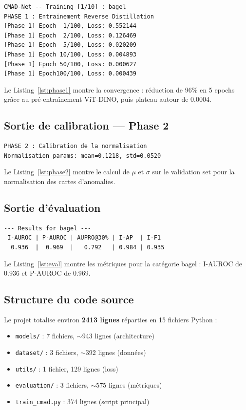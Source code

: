 \documentclass[12pt,a4paper,oneside]{report}
\begin{document}
\begin{lstlisting}[language={}, caption={Sortie d'entraînement Phase 1 (bagel)}, label={lst:phase1}]
CMAD-Net -- Training [1/10] : bagel
PHASE 1 : Entrainement Reverse Distillation
[Phase 1] Epoch  1/100, Loss: 0.552144
[Phase 1] Epoch  2/100, Loss: 0.126469
[Phase 1] Epoch  5/100, Loss: 0.020209
[Phase 1] Epoch 10/100, Loss: 0.004893
[Phase 1] Epoch 50/100, Loss: 0.000627
[Phase 1] Epoch100/100, Loss: 0.000439
\end{lstlisting}

Le Listing~\ref{lst:phase1} montre la convergence : réduction de 96\% en 5 epochs grâce au pré-entraînement ViT-DINO, puis plateau autour de 0.0004.

\subsection{Sortie de calibration --- Phase 2}

\begin{lstlisting}[language={}, caption={Sortie de calibration Phase 2}, label={lst:phase2}]
PHASE 2 : Calibration de la normalisation
Normalisation params: mean=0.1218, std=0.0520
\end{lstlisting}

Le Listing~\ref{lst:phase2} montre le calcul de $\mu$ et $\sigma$ sur le validation set pour la normalisation des cartes d'anomalies.

\subsection{Sortie d'évaluation}

\begin{lstlisting}[language={}, caption={Résultats pour bagel}, label={lst:eval}]
--- Results for bagel ---
 I-AUROC | P-AUROC | AUPRO@30% | I-AP  | I-F1
  0.936  |  0.969  |   0.792   | 0.984 | 0.935
\end{lstlisting}

Le Listing~\ref{lst:eval} montre les métriques pour la catégorie bagel : I-AUROC de 0.936 et P-AUROC de 0.969.

\subsection{Structure du code source}

Le projet totalise environ \textbf{2413 lignes} réparties en 15 fichiers Python :
\begin{itemize}
    \item \texttt{models/} : 7 fichiers, $\sim$943 lignes (architecture)
    \item \texttt{dataset/} : 3 fichiers, $\sim$392 lignes (données)
    \item \texttt{utils/} : 1 fichier, 129 lignes (loss)
    \item \texttt{evaluation/} : 3 fichiers, $\sim$575 lignes (métriques)
    \item \texttt{train\_cmad.py} : 374 lignes (script principal)
\end{itemize}
\end{document}
